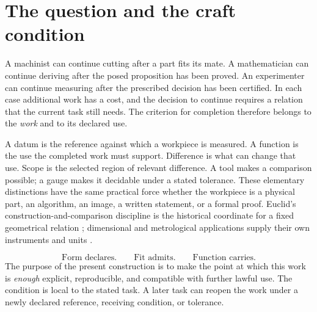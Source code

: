 \documentclass[11pt,letterpaper]{article}
\theoremstyle{definition}\newtheorem{definition}{Definition}
\begin{document}
\section{The question and the craft condition}
A machinist can continue cutting after a part fits its mate. A mathematician can continue deriving after the posed proposition has been proved. An experimenter can continue measuring after the prescribed decision has been certified. In each case additional work has a cost, and the decision to continue requires a relation that the current task still needs. The criterion for completion therefore belongs to the \emph{work} and to its declared use.

A datum is the reference against which a workpiece is measured. A function is the use the completed work must support. Difference is what can change that use. Scope is the selected region of relevant difference. A tool makes a comparison possible; a gauge makes it decidable under a stated tolerance. These elementary distinctions have the same practical force whether the workpiece is a physical part, an algorithm, an image, a written statement, or a formal proof. Euclid's construction-and-comparison discipline is the historical coordinate for a fixed geometrical relation \cite{euclid}; dimensional and metrological applications supply their own instruments and units \cite{gum,conformity}.

\begin{equation}\label{eq:craft}
\boxed{\text{Form declares.}\qquad\text{Fit admits.}\qquad\text{Function carries.}}
\end{equation}
The purpose of the present construction is to make the point at which this work is \emph{enough} explicit, reproducible, and compatible with further lawful use. The condition is local to the stated task. A later task can reopen the work under a newly declared reference, receiving condition, or tolerance.
\end{document}
